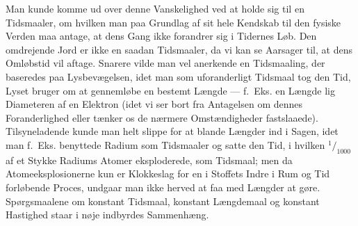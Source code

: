 \documentclass[12pt,a4paper]{article}
\begin{document}
Man kunde komme ud over denne Vanskelighed ved at holde sig til en Tidsmaaler,
om hvilken man paa Grundlag af sit hele Kendskab til den fysiske Verden maa
antage, at dens Gang ikke forandrer sig i Tidernes Løb. Den omdrejende Jord er
ikke en saadan Tidsmaaler, da vi kan se Aarsager til, at dens Omløbstid vil
aftage. Snarere vilde man vel anerkende en Tidsmaaling, der baseredes paa
Lysbevægelsen, idet man som uforanderligt Tidsmaal tog den Tid, Lyset bruger om
at gennemløbe en bestemt Længde --- f.~Eks. en Længde lig Diameteren af en
Elektron (idet vi ser bort fra Antagelsen om dennes Foranderlighed eller tænker
os de nærmere Omstændigheder fastslaaede). Tilsyneladende kunde man helt slippe
for at blande Længder ind i Sagen, idet man f.~Eks. benyttede Radium som
Tidsmaaler og satte den Tid, i hvilken $^{1}\!/_{1000}$ af et Stykke Radiums
Atomer eksploderede, som Tidsmaal; men da Atomeeksplosionerne kun er Klokkeslag
for en i Stoffets Indre i Rum og Tid forløbende Proces, undgaar man ikke herved
at faa med Længder at gøre. Spørgsmaalene om konstant Tidsmaal, konstant
Længdemaal og konstant Hastighed staar i nøje indbyrdes Sammenhæng.
\end{document}
